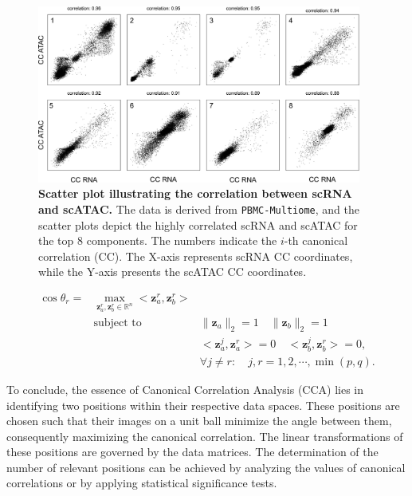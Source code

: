 \begin{figure}[!ht]
	\centering
	\includegraphics[width=0.95\textwidth]{CC_corrlation_scatter/fig}
	\vspace{0.1cm}
	\caption[Scatter plot illustrating the correlation between scRNA and scATAC.]{\textbf{Scatter plot illustrating the correlation between scRNA and scATAC.} The data is derived from \texttt{PBMC-Multiome}, and the scatter plots depict the highly correlated scRNA and scATAC for the top 8 components. The numbers indicate the $i$-th canonical correlation (CC). The X-axis represents scRNA CC coordinates, while the Y-axis presents the scATAC CC coordinates.}
	\label{fig:CC_corrlation_scatter}
\end{figure}

\begin{equation}
\begin{aligned}
\cos \theta_r = &\underset{{\mathbf z}_a^r, {\mathbf z}_b^r \in\mathbb{R}^n}{\max}<{\mathbf z}_a^r, {\mathbf z}_b^r>\\
                &\text{subject to  } & \|{\mathbf z}_a\|_2=1\quad \|{\mathbf z}_b\|_2=1\\
				  & & <{\mathbf z}_a^j, {\mathbf z}_a^r>=0\quad <{\mathbf z}_b^j, {\mathbf z}_b^r>=0,\\
				  & & \forall j \neq r: \quad j,r = 1,2,\cdots,\min(p,q).
\end{aligned}
\end{equation}

 To conclude, the essence of Canonical Correlation Analysis (CCA) lies in identifying two positions within their respective data spaces. These positions are chosen such that their images on a unit ball minimize the angle between them, consequently maximizing the canonical correlation. The linear transformations of these positions are governed by the data matrices. The determination of the number of relevant positions can be achieved by analyzing the values of canonical correlations or by applying statistical significance tests.


